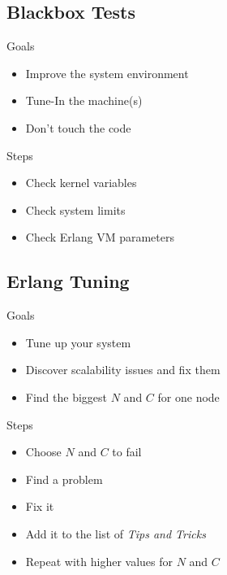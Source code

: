 \documentclass[utf8]{beamer}
\begin{document}
\subsection{Blackbox Tests}
\begin{frame}{Goals}
	\begin{itemize}
		\item Improve the system environment
		\item Tune-In the machine(s)
		\item \alert{Don't} touch the code
	\end{itemize}
\end{frame}
\begin{frame}{Steps}
	\begin{itemize}
		\item Check kernel variables
		\item Check system limits
		\item Check Erlang VM parameters
	\end{itemize}
\end{frame}

\subsection{Erlang Tuning}
\begin{frame}{Goals}
	\begin{itemize}
		\item Tune up \alert{your} system
		\item Discover scalability issues and fix them
		\item Find the biggest $N$ and $C$ for \alert{one node}
	\end{itemize}
\end{frame}
\begin{frame}{Steps}
	\begin{itemize}
		\item Choose $N$ and $C$ to fail
		\item Find a problem
		\item Fix it
		\item Add it to the list of \emph{Tips and Tricks}
		\pause
		\item Repeat with higher values for $N$ and $C$
	\end{itemize}
\end{frame}
\end{document}
